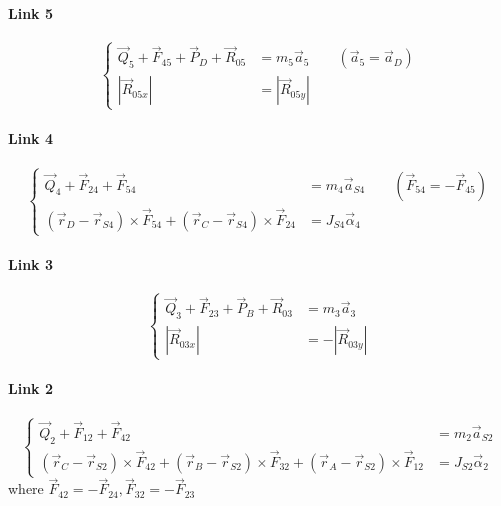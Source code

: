 \paragraph{Link 5}
\begin{equation}
	\left\{
	\begin{array}{cl}
	\vec{Q}_{5}+\vec{F}_{45}+\vec{P}_D+\vec{R}_{05}&=m_5\vec{a}_5\qquad(\vec{a}_5=\vec{a}_D)\\
	\left|\vec{R}_{05x}\right|&=\left|\vec{R}_{05y}\right|
	\end{array} 
	\right.
\end{equation}
\paragraph{Link 4}
\begin{equation}
\left\{
\begin{array}{cl}
\vec{Q}_{4}+\vec{F}_{24}+\vec{F}_{54}&=m_4\vec{a}_{S4}\qquad(\vec{F}_{54}=-\vec{F}_{45})\\
(\vec{r}_D-\vec{r}_{S4})\times \vec{F}_{54}+(\vec{r}_C-\vec{r}_{S4})\times \vec{F}_{24}&=J_{S4}\vec{\alpha}_4
\end{array} 
\right.
\end{equation}
\paragraph{Link 3}
\begin{equation}
\left\{
\begin{array}{cl}
\vec{Q}_{3}+\vec{F}_{23}+\vec{P}_B+\vec{R}_{03}&=m_3\vec{a}_3\\
\left|\vec{R}_{03x}\right|&=-\left|\vec{R}_{03y}\right|
\end{array} 
\right.
\end{equation}
\paragraph{Link 2}
\begin{equation}
	\left\{
	\begin{array}{cl}
	\vec{Q}_{2}+\vec{F}_{12}+\vec{F}_{42}&=m_2\vec{a}_{S2}\\
	(\vec{r}_C-\vec{r}_{S2})\times \vec{F}_{42}+(\vec{r}_B-\vec{r}_{S2})\times \vec{F}_{32}+(\vec{r}_A-\vec{r}_{S2})\times \vec{F}_{12}&=J_{S2}\vec{\alpha}_2
	\end{array} 
	\right.
\end{equation}
where $ \vec{F}_{42}=-\vec{F}_{24}, \vec{F}_{32}=-\vec{F}_{23} $
